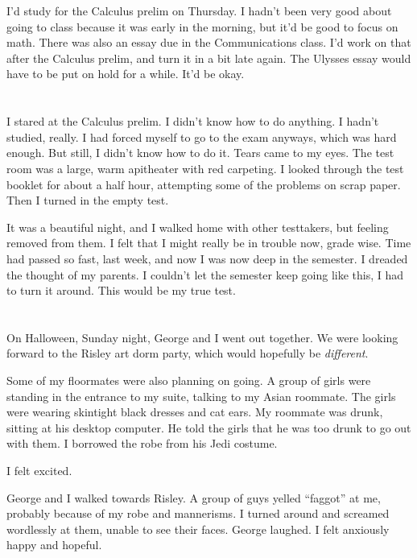 I'd study for the Calculus prelim on Thursday.  I hadn't been very good about
going to class because it was early in the morning, but it'd be good to focus
on math.  There was also an essay due in the Communications class.  I'd work on
that after the Calculus prelim, and turn it in a bit late again.  The Ulysses
essay would have to be put on hold for a while.  It'd be okay.

\section{}

I stared at the Calculus prelim.  I didn't know how to do anything.  I hadn't
studied, really. I had forced myself to go to the exam anyways, which was hard
enough.  But still, I didn't know how to do it.  Tears came to my eyes.  The
test room was a large, warm apitheater with red carpeting.  I looked through the
test booklet for about a half hour, attempting some of the problems on scrap
paper.  Then I turned in the empty test. 

It was a beautiful night, and I walked home with other testtakers, but feeling
removed from them.  I felt that I might really be in trouble now, grade wise.
Time had passed so fast, last week, and now I was now deep in the semester.  I
dreaded the thought of my parents.  I couldn't let the semester keep going like
this, I had to turn it around.  This would be my true test.

\section{}

On Halloween, Sunday night, George and I went out together.  We were looking
forward to the Risley art dorm party, which would hopefully be
\textit{different}.

Some of my floormates were also planning on going.  A group of girls were
standing in the entrance to my suite, talking to my Asian roommate.  The girls
were wearing skintight black dresses and cat ears.  My roommate was drunk,
sitting at his desktop computer.  He told the girls that he was too drunk to go
out with them.  I borrowed the robe from his Jedi costume.

I felt excited.

George and I walked towards Risley.  A group of guys yelled ``faggot'' at me,
probably because of my robe and mannerisms.  I turned around and screamed
wordlessly at them, unable to see their faces.  George laughed.  I felt
anxiously happy and hopeful.

